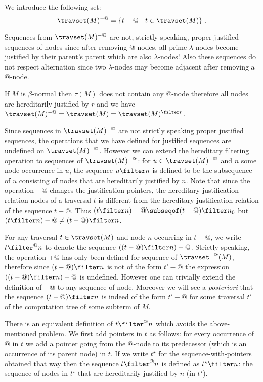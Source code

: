 We introduce the following set:
$$
\travset(M)^{-@} = \{ t - @ \ | \  t \in \travset(M) \} \ .
$$

\begin{remark}
Sequences from $\travset(M)^{-@}$ are not, strictly speaking, proper
justified sequences of nodes since after removing @-nodes, all prime
$\lambda$-nodes become justified by their parent's parent which are
also $\lambda$-nodes! Also these sequences do not respect
alternation since two $\lambda$-nodes may become adjacent after
removing a @-node.
\end{remark}


\begin{remark}
If $M$ is $\beta$-normal then $\tau(M)$ does not contain any @-node
therefore all nodes are hereditarily justified by $r$ and we have
$\travset(M)^{-@} = \travset(M) = \travset(M)^{\filter r }$.
\end{remark}



Since sequences in $\travset(M)^{-@}$ are not strictly speaking
proper justified sequences, the operations that we have defined for
justified sequences are undefined on $\travset(M)^{-@}$. However we
can extend the hereditary filtering operation to sequences of
$\travset(M)^{-@}$: for $u\in \travset(M)^{-@}$ and $n$ some node
occurrence in $u$, the sequence $u\filter n$ is defined to be the
subsequence of $u$ consisting of nodes that are hereditarily
justified by $n$. Note that since the operation $-@$ changes the
justification pointers, the hereditary justification relation nodes
of a traversal $t$ is different from the hereditary justification
relation of the sequence $t-@$. Thus $(t\filter n)-@ \subseqof (t-@)
\filter n_0$ but $(t\filter n)-@ \neq (t-@) \filter n$.

For any traversal $t\in \travset(M)$ and node $n$ occurring in
$t-@$, we write $t \filter^@ n$ to denote the sequence $((t-@)
\filter n)+@$. Strictly speaking, the operation +@ has only been
defined for sequence of $\travset^{-@}(M)$, therefore since $(t-@)
\filter n$ is not of the form $t'-@$ the expression $((t-@) \filter
n)+@$ is undefined. However one can trivially extend the definition
of $+@$ to any sequence of node. Moreover we will see a {\em
posteriori} that the sequence $(t-@) \filter n$ is indeed of the
form $t'-@$ for some traversal $t'$ of the computation tree of some
subterm of $M$.

There is an equivalent definition of $t \filter^@ n$ which avoids the above-mentioned problem.
We first add pointers in $t$ as follows: for every occurrence of
$@$ in $t$ we add a pointer going from the @-node to its predecessor (which is an occurrence of its parent node) in $t$. If we write $t^\star$ for the sequence-with-pointers obtained that way then
the sequence $t \filter^@ n$ is defined as $t^\star \filter n$: the
sequence of nodes in $t^\star$ that are hereditarily justified by $n$ (in $t^\star$).
\bigskip


